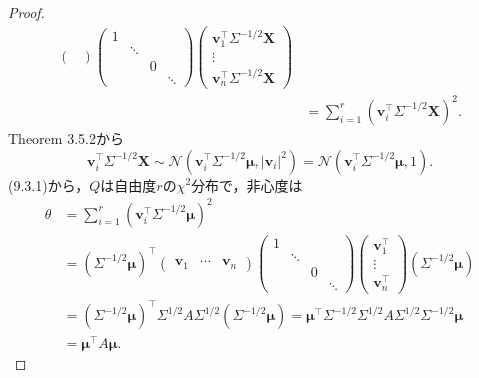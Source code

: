 \begin{proof}
\begin{align*}
\begin{pmatrix}
    \end{pmatrix}
    \begin{pmatrix}
      1 & & & \\
      & \ddots & & \\
      & & 0 & \\
      & & & \ddots
    \end{pmatrix}
    \begin{pmatrix}
      \boldsymbol{v}_1^\top \Sigma^{-1/2} \boldsymbol{X} \\ \vdots \\ \boldsymbol{v}_n^\top \Sigma^{-1/2} \boldsymbol{X}
    \end{pmatrix}
    \\
    &= \sum_{i=1}^r \left( \boldsymbol{v}_i^\top \Sigma^{-1/2} \boldsymbol{X} \right)^2 .
  \end{align*}
  Theorem 3.5.2から
  \[
  \boldsymbol{v}_i^\top \Sigma^{-1/2} \boldsymbol{X}
  \sim \mathcal{N}(\boldsymbol{v}_i^\top \Sigma^{-1/2}\boldsymbol\mu, \lvert \boldsymbol{v}_i\rvert^2)
  = \mathcal{N}(\boldsymbol{v}_i^\top \Sigma^{-1/2}\boldsymbol\mu, 1) .
  \]
  (9.3.1)から，\(Q\)は自由度\(r\)の\(\chi^2\)分布で，非心度は
  \begin{align*}
    \theta &= \sum_{i=1}^r \left( \boldsymbol{v}_i^\top \Sigma^{-1/2}\boldsymbol\mu \right)^2 \\
    &=
    (\Sigma^{-1/2} \boldsymbol\mu)^\top \begin{pmatrix}
      \boldsymbol{v}_1 & \cdots & \boldsymbol{v}_n
    \end{pmatrix}
    \begin{pmatrix}
      1 & & & \\
      & \ddots & & \\
      & & 0 & \\
      & & & \ddots
    \end{pmatrix}
    \begin{pmatrix}
      \boldsymbol{v}_1^\top \\ \vdots \\ \boldsymbol{v}_n^\top
    \end{pmatrix} (\Sigma^{-1/2} \boldsymbol\mu)
    \\
    &= (\Sigma^{-1/2} \boldsymbol\mu)^\top \Sigma^{1/2} A \Sigma^{1/2} (\Sigma^{-1/2} \boldsymbol\mu)
    = \boldsymbol\mu^\top \Sigma^{-1/2} \Sigma^{1/2} A \Sigma^{1/2} \Sigma^{-1/2} \boldsymbol\mu \\
    &= \boldsymbol\mu^\top A \boldsymbol\mu .
  \end{align*}


\end{proof}
